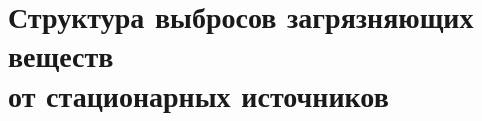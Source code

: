 









\section{Структура выбросов загрязняющих веществ \\ от
стационарных источников}
\begin{frame}{\insertsectionhead}
\end{frame}










